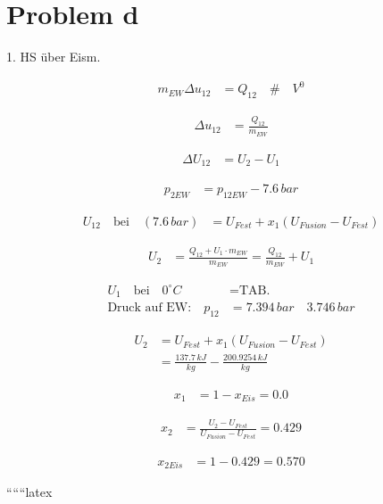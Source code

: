 \section*{Problem d}

1. HS über Eism. \quad {}

\begin{align*}
    m_{EW} \Delta u_{12} &= Q_{12} \quad \# \quad V^0
\end{align*}

\begin{align*}
    \Delta u_{12} &= \frac{Q_{12}}{m_{EW}}
\end{align*}

\begin{align*}
    \Delta U_{12} &= U_2 - U_1
\end{align*}

\begin{align*}
    p_{2EW} &= p_{12EW} - 7.6 \, bar
\end{align*}

\begin{align*}
    U_{12} \quad \text{bei} \quad (7.6 \, bar) &= U_{Fest} + x_1 (U_{Fusion} - U_{Fest})
\end{align*}

\begin{align*}
    U_2 &= \frac{Q_{12} + U_1 \cdot m_{EW}}{m_{EW}} = \frac{Q_{12}}{m_{EW}} + U_1
\end{align*}

\begin{align*}
    U_1 \quad \text{bei} \quad 0^\circ C &= \text{TAB.} \\
    \text{Druck auf EW:} \quad p_{12} &= 7.394 \, bar \quad 3.746 \, bar
\end{align*}

\begin{align*}
    U_2 &= U_{Fest} + x_1 (U_{Fusion} - U_{Fest}) \\
    &= \frac{137.7 \, kJ}{kg} - \frac{200.9254 \, kJ}{kg}
\end{align*}

\begin{align*}
    x_1 &= 1 - x_{Eis} = 0.0
\end{align*}

\begin{align*}
    x_2 &= \frac{U_2 - U_{Fest}}{U_{Fusion} - U_{Fest}} = 0.429
\end{align*}

\begin{align*}
    x_{2Eis} &= 1 - 0.429 = 0.570
\end{align*}

``````latex